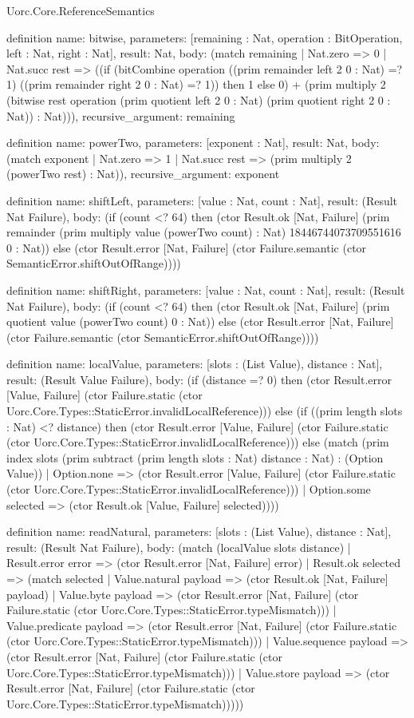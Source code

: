 \begin{lexlean}{Uorc.Core.ReferenceSemantics}
\begin{semanticmodule}
definition{
  name: bitwise,
  parameters: [remaining : Nat, operation : BitOperation, left : Nat, right : Nat],
  result: Nat,
  body: (match remaining
    | Nat.zero => 0
    | Nat.succ rest => ((if (bitCombine operation ((prim remainder left 2 0 : Nat) =? 1) ((prim remainder right 2 0 : Nat) =? 1)) then 1 else 0) + (prim multiply 2 (bitwise rest operation (prim quotient left 2 0 : Nat) (prim quotient right 2 0 : Nat)) : Nat))),
  recursive_argument: remaining
}

definition{
  name: powerTwo,
  parameters: [exponent : Nat],
  result: Nat,
  body: (match exponent | Nat.zero => 1 | Nat.succ rest => (prim multiply 2 (powerTwo rest) : Nat)),
  recursive_argument: exponent
}

definition{
  name: shiftLeft,
  parameters: [value : Nat, count : Nat],
  result: (Result Nat Failure),
  body: (if (count <? 64) then (ctor Result.ok [Nat, Failure] (prim remainder (prim multiply value (powerTwo count) : Nat) 18446744073709551616 0 : Nat)) else (ctor Result.error [Nat, Failure] (ctor Failure.semantic (ctor SemanticError.shiftOutOfRange))))
}

definition{
  name: shiftRight,
  parameters: [value : Nat, count : Nat],
  result: (Result Nat Failure),
  body: (if (count <? 64) then (ctor Result.ok [Nat, Failure] (prim quotient value (powerTwo count) 0 : Nat)) else (ctor Result.error [Nat, Failure] (ctor Failure.semantic (ctor SemanticError.shiftOutOfRange))))
}

definition{
  name: localValue,
  parameters: [slots : (List Value), distance : Nat],
  result: (Result Value Failure),
  body: (if (distance =? 0) then (ctor Result.error [Value, Failure] (ctor Failure.static (ctor Uorc.Core.Types::StaticError.invalidLocalReference))) else (if ((prim length slots : Nat) <? distance) then (ctor Result.error [Value, Failure] (ctor Failure.static (ctor Uorc.Core.Types::StaticError.invalidLocalReference))) else (match (prim index slots (prim subtract (prim length slots : Nat) distance : Nat) : (Option Value))
    | Option.none => (ctor Result.error [Value, Failure] (ctor Failure.static (ctor Uorc.Core.Types::StaticError.invalidLocalReference)))
    | Option.some selected => (ctor Result.ok [Value, Failure] selected))))
}

definition{
  name: readNatural,
  parameters: [slots : (List Value), distance : Nat],
  result: (Result Nat Failure),
  body: (match (localValue slots distance)
    | Result.error error => (ctor Result.error [Nat, Failure] error)
    | Result.ok selected => (match selected
      | Value.natural payload => (ctor Result.ok [Nat, Failure] payload)
      | Value.byte payload => (ctor Result.error [Nat, Failure] (ctor Failure.static (ctor Uorc.Core.Types::StaticError.typeMismatch)))
      | Value.predicate payload => (ctor Result.error [Nat, Failure] (ctor Failure.static (ctor Uorc.Core.Types::StaticError.typeMismatch)))
      | Value.sequence payload => (ctor Result.error [Nat, Failure] (ctor Failure.static (ctor Uorc.Core.Types::StaticError.typeMismatch)))
      | Value.store payload => (ctor Result.error [Nat, Failure] (ctor Failure.static (ctor Uorc.Core.Types::StaticError.typeMismatch)))))
}


\end{semanticmodule}
\end{lexlean}
